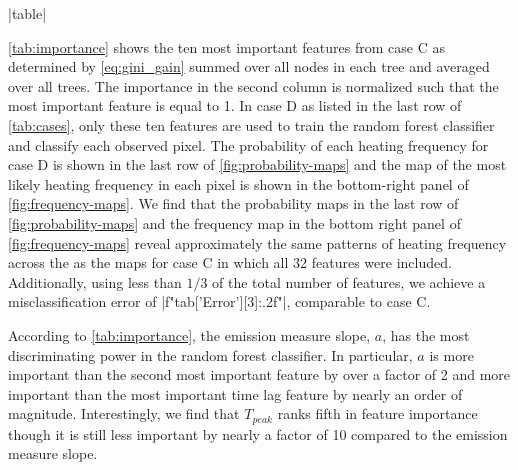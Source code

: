 \py[manager_ml]|table|

\autoref{tab:importance} shows the ten most important features from case C as determined by \autoref{eq:gini_gain} summed over all nodes in each tree and averaged over all trees.
The importance in the second column is normalized such that the most important feature is equal to 1.
In case D as listed in the last row of \autoref{tab:cases}, only these ten features are used to train the random forest classifier and classify each observed pixel.
The probability of each heating frequency for case D is shown in the last row of \autoref{fig:probability-maps} and the map of the most likely heating frequency in each pixel is shown in the bottom-right panel of \autoref{fig:frequency-maps}.
We find that the probability maps in the last row of \autoref{fig:probability-maps} and the frequency map in the bottom right panel of \autoref{fig:frequency-maps} reveal approximately the same patterns of heating frequency across the \AR{} as the maps for case C in which all 32 features were included.
Additionally, using less than $1/3$ of the total number of features, we achieve a misclassification error of \py[manager_ml]|f"{tab['Error'][3]:.2f}"|, comparable to case C.

According to \autoref{tab:importance}, the emission measure slope, $a$, has the most discriminating power in the random forest classifier.
In particular, $a$ is more important than the second most important feature by over a factor of 2 and more important than the most important time lag feature by nearly an order of magnitude.
Interestingly, we find that $T_{peak}$ ranks fifth in feature importance though it is still less important by nearly a factor of 10 compared to the emission measure slope.

